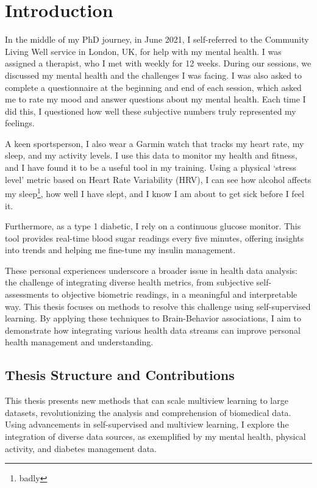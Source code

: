 \graphicspath{{chapters/introduction/}}


\chapter{Introduction}\label{chap:introduction}

In the middle of my PhD journey, in June 2021, I self-referred to the Community Living Well service in London, UK, for help with my mental health.
I was assigned a therapist, who I met with weekly for 12 weeks.
During our sessions, we discussed my mental health and the challenges I was facing.
I was also asked to complete a questionnaire at the beginning and end of each session, which asked me to rate my mood and answer questions about my mental health.
Each time I did this, I questioned how well these subjective numbers truly represented my feelings.

A keen sportsperson, I also wear a Garmin watch that tracks my heart rate, my sleep, and my activity levels.
I use this data to monitor my health and fitness, and I have found it to be a useful tool in my training.
Using a physical `stress level' metric based on Heart Rate Variability (HRV), I can see how alcohol affects my sleep\footnote{badly}, how well I have slept, and I know I am about to get sick before I feel it.

Furthermore, as a type 1 diabetic, I rely on a continuous glucose monitor.
This tool provides real-time blood sugar readings every five minutes, offering insights into trends and helping me fine-tune my insulin management.

These personal experiences underscore a broader issue in health data analysis: the challenge of integrating diverse health metrics, from subjective self-assessments to objective biometric readings, in a meaningful and interpretable way.
This thesis focuses on methods to resolve this challenge using self-supervised learning.
By applying these techniques to Brain-Behavior associations, I aim to demonstrate how integrating various health data streams can improve personal health management and understanding.

\section{Thesis Structure and Contributions}

This thesis presents new methods that can scale multiview learning to large datasets, revolutionizing the analysis and comprehension of biomedical data.
Using advancements in self-supervised and multiview learning, I explore the integration of diverse data sources, as exemplified by my mental health, physical activity, and diabetes management data.

